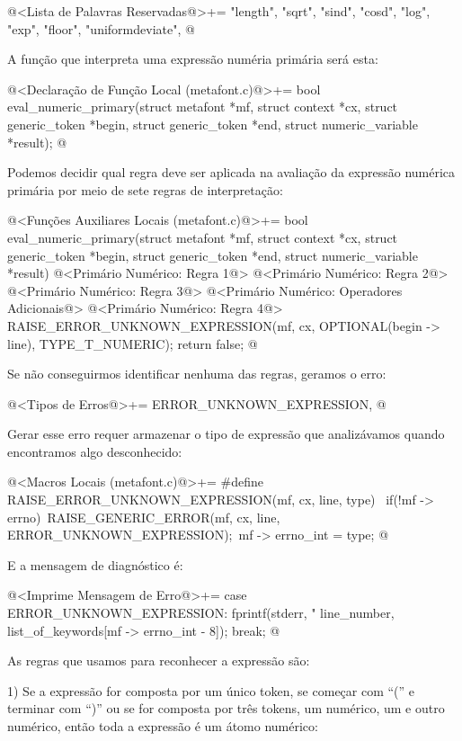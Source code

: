\iniciocodigo
@<Lista de Palavras Reservadas@>+=
"length", "sqrt", "sind", "cosd", "log", "exp", "floor", "uniformdeviate",
@
\fimcodigo

A função que interpreta uma expressão numéria primária será esta:

\iniciocodigo
@<Declaração de Função Local (metafont.c)@>+=
bool eval_numeric_primary(struct metafont *mf, struct context *cx,
                          struct generic_token *begin,
                          struct generic_token *end,
                          struct numeric_variable *result);
@
\fimcodigo

Podemos decidir qual regra deve ser aplicada na avaliação da expressão
numérica primária por meio de sete regras de interpretação:

\iniciocodigo
@<Funções Auxiliares Locais (metafont.c)@>+=
bool eval_numeric_primary(struct metafont *mf, struct context *cx,
                          struct generic_token *begin,
                          struct generic_token *end,
                          struct numeric_variable *result){
  @<Primário Numérico: Regra 1@>
  @<Primário Numérico: Regra 2@>
  @<Primário Numérico: Regra 3@>
  @<Primário Numérico: Operadores Adicionais@>
  @<Primário Numérico: Regra 4@>
  RAISE_ERROR_UNKNOWN_EXPRESSION(mf, cx, OPTIONAL(begin -> line),
                                 TYPE_T_NUMERIC);
  return false;
}
@

Se não conseguirmos identificar nenhuma das regras, geramos o erro:

\iniciocodigo
@<Tipos de Erros@>+=
ERROR_UNKNOWN_EXPRESSION,
@
\fimcodigo

Gerar esse erro requer armazenar o tipo de expressão que analizávamos
quando encontramos algo desconhecido:

\iniciocodigo
@<Macros Locais (metafont.c)@>+=
#define RAISE_ERROR_UNKNOWN_EXPRESSION(mf, cx, line, type) {\
  if(!mf -> errno){\
    RAISE_GENERIC_ERROR(mf, cx, line, ERROR_UNKNOWN_EXPRESSION);\
    mf -> errno_int = type;}}
@
\fimcodigo

E a mensagem de diagnóstico é:

\iniciocodigo
@<Imprime Mensagem de Erro@>+=
case ERROR_UNKNOWN_EXPRESSION:
  fprintf(stderr, "%
          line_number, list_of_keywords[mf -> errno_int - 8]);
  break;
@
\fimcodigo

As regras que usamos para reconhecer a expressão são:

1) Se a expressão for composta por um único token, se começar com
``('' e terminar com ``)'' ou se for composta por três tokens, um
numérico, um \monoespaco{/} e outro numérico, então toda a expressão é
um átomo numérico:

